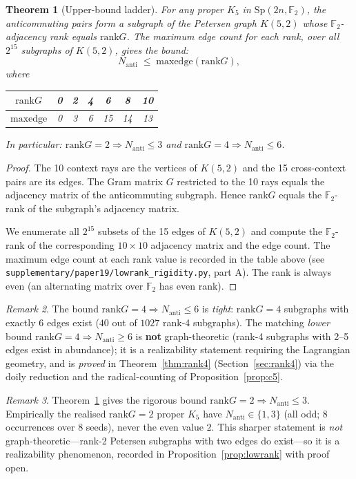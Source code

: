 \documentclass[11pt,a4paper]{article}
\newtheorem{theorem}{Theorem}[section]
\theoremstyle{remark}
\newtheorem{remark}[theorem]{Remark}
\newcommand{\Sp}{\mathrm{Sp}}
\newcommand{\rank}{\mathrm{rank}}
\newcommand{\Nanti}{N_{\mathrm{anti}}}
\begin{document}
\begin{theorem}[Upper-bound ladder]\label{thm:upbound}
For any proper $K_5$ in $\Sp(2n,\mathbb F_2)$, the anticommuting pairs form a
subgraph of the Petersen graph $K(5,2)$ whose $\mathbb F_2$-adjacency rank equals
$\rank G$.  The maximum edge count for each rank, over all $2^{15}$ subgraphs of
$K(5,2)$, gives the bound:
\[
  \Nanti \;\le\; \mathrm{maxedge}(\rank G),
\]
where
\begin{center}
\begin{tabular}{ccccccc}
\toprule
$\rank G$ & 0 & 2 & 4 & 6 & 8 & 10 \\
\midrule
$\mathrm{maxedge}$ & 0 & 3 & 6 & 15 & 14 & 13 \\
\bottomrule
\end{tabular}
\end{center}
In particular: $\rank G=2\Rightarrow\Nanti\le3$ and $\rank G=4\Rightarrow\Nanti\le6$.
\end{theorem}

\begin{proof}
The 10 context rays are the vertices of $K(5,2)$ and the 15 cross-context pairs are its
edges.  The Gram matrix $G$ restricted to the 10 rays equals the adjacency matrix of the
anticommuting subgraph.  Hence $\rank G$ equals the $\mathbb F_2$-rank of the subgraph's
adjacency matrix.

We enumerate all $2^{15}$ subsets of the 15 edges of $K(5,2)$ and compute the
$\mathbb F_2$-rank of the corresponding $10\times10$ adjacency matrix and the edge
count.  The maximum edge count at each rank value is recorded in the table above
(see \texttt{supplementary/paper19/lowrank\_rigidity.py}, part A).
The rank is always even (an alternating matrix over $\mathbb F_2$ has even rank).
\end{proof}

\begin{remark}
The bound $\rank G=4\Rightarrow\Nanti\le6$ is \emph{tight}: $\rank G=4$ subgraphs
with exactly 6 edges exist ($40$ out of $1027$ rank-4 subgraphs). The matching
\emph{lower} bound $\rank G=4\Rightarrow\Nanti\ge6$ is \textbf{not} graph-theoretic
(rank-4 subgraphs with 2--5 edges exist in abundance); it is a realizability
statement requiring the Lagrangian geometry, and is \emph{proved} in
Theorem~\ref{thm:rank4} (Section~\ref{sec:rank4}) via the doily reduction and the
radical-counting of Proposition~\ref{prop:c5}.
\end{remark}

\begin{remark}\label{rem:rankG2}
Theorem~\ref{thm:upbound} gives the rigorous bound $\rank G=2\Rightarrow\Nanti\le3$.
Empirically the realised $\rank G=2$ proper $K_5$ have $\Nanti\in\{1,3\}$ (all odd;
8 occurrences over 8 seeds), never the even value $2$.  This sharper statement is
\emph{not} graph-theoretic---rank-2 Petersen subgraphs with two edges do exist---so
it is a realizability phenomenon, recorded in Proposition~\ref{prop:lowrank} with
proof open.
\end{remark}
\end{document}
